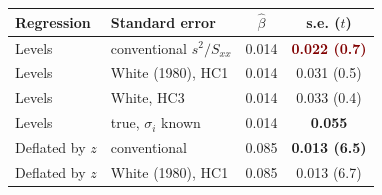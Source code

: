 \begin{tabular}{@{}llcc@{}}
\toprule
Regression & Standard error & $\hat\beta$ & s.e. ($t$) \\
\midrule
Levels & conventional $s^2/S_{xx}$ & 0.014 & \textcolor{Maroon}{\bfseries 0.022 (0.7)} \\
Levels & White (1980), HC1 & 0.014 & 0.031 (0.5) \\
Levels & White, HC3 & 0.014 & 0.033 (0.4) \\
Levels & true, $\sigma_i$ known & 0.014 & \textcolor{DeepNavy}{\bfseries 0.055} \\
\midrule
Deflated by $z$ & conventional & 0.085 & \textcolor{DeepNavy}{\bfseries 0.013 (6.5)} \\
Deflated by $z$ & White (1980), HC1 & 0.085 & 0.013 (6.7) \\
\bottomrule
\end{tabular}
